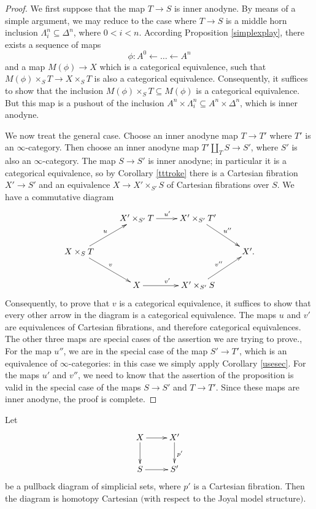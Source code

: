 \begin{proof}
We first suppose that the map $T \rightarrow S$ is inner anodyne. By means of a simple argument, we may reduce to the case where $T \rightarrow S$ is a middle horn inclusion $\Lambda^n_i \subseteq \Delta^n$, where $0 < i < n$. 
According Proposition \ref{simplexplay}, there exists a sequence of maps
$$ \phi: A^0 \leftarrow \ldots \leftarrow A^n $$ and a map
$M(\phi) \rightarrow X$ which is a categorical equivalence, such that
$M(\phi) \times_{S} T \rightarrow X \times_{S} T$ is also a categorical equivalence.
Consequently, it suffices to show that the inclusion $M(\phi) \times_{S} T \subseteq M(\phi)$ is a categorical equivalence. But this map is a pushout of the inclusion
$A^n \times \Lambda^n_i \subseteq A^n \times \Delta^n$, which is inner anodyne.

We now treat the general case. Choose an inner anodyne map $T \rightarrow T'$ where $T'$ is an $\infty$-category. Then choose an inner anodyne map $T' \coprod_{T} S \rightarrow S'$, where $S'$ is also an $\infty$-category. The map $S \rightarrow S'$ is inner anodyne; in particular it is a categorical equivalence, so by
Corollary \ref{tttroke} there is a Cartesian fibration $X' \rightarrow S'$ and an equivalence
$X \rightarrow X' \times_{S'} S$ of Cartesian fibrations over $S$. We have a commutative diagram
$$ \xymatrix{ & X' \times_{S'} T \ar[r]^{u'} & X' \times_{S'} T' \ar[dr]^{u''} & \\
X \times_{S} T \ar[ur]^{u} \ar[dr]^{v} & & & X'. \\
& X \ar[r]^{v'} & X' \times_{S'} S \ar[ur]^{v''} & \\}$$
Consequently, to prove that $v$ is a categorical equivalence, it suffices to show that every other arrow in the diagram is a categorical equivalence. The maps $u$ and $v'$ are equivalences of Cartesian fibrations, and therefore categorical equivalences. The other three maps are special cases of the assertion we are trying to prove., For the map $u''$, we are in the special case of the map $S' \rightarrow T'$, which is an equivalence of $\infty$-categories: in this case we simply apply Corollary \ref{usesec}. For the maps $u'$ and $v''$, we need to know that the assertion of the proposition is valid in the special case of the maps $S \rightarrow S'$ and $T \rightarrow T'$. Since these maps are inner anodyne, the proof is complete.
\end{proof}

\begin{corollary}\label{basety}
Let 
$$ \xymatrix{ X \ar[r] \ar[d] & X' \ar[d]^{p'} \\
S \ar[r] & S' }$$
be a pullback diagram of simplicial sets, where $p'$ is a Cartesian fibration. Then the diagram is homotopy Cartesian $($with respect to the Joyal model structure$)$.
\end{corollary}

